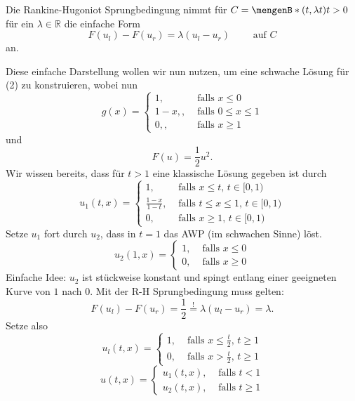 \begin{bemerkung}
	Die Rankine-Hugoniot Sprungbedingung nimmt für $C = \set[(t,\lambda t)]{t >0}$ für ein $\lambda \in \mathbb{R}$ die einfache Form
	\[
		F(u_l)-F(u_r) = \lambda (u_l-u_r) \qquad \text{ auf }C
	\]
	an.
\end{bemerkung} 
Diese einfache Darstellung wollen wir nun nutzen, um eine schwache Lösung für (2) zu konstruieren, wobei nun
\[
	g(x) = \begin{cases}
		1, &\text{ falls }x \leq 0\\
		1-x, , &\text{ falls }0 \leq x \leq 1 \\
		0, , &\text{ falls }x \geq 1
	\end{cases}
\]
und \[
	F(u) = \frac{1}{2} u^2.
\]
Wir wissen bereits, dass für $t>1$ eine klassische Lösung gegeben ist durch
\[
	u_1(t,x) = \begin{cases}
		1, &\text{ falls }x \leq t, \,t \in [0,1)\\
		\frac{1-x}{1-t} , &\text{ falls }t \leq x \leq 1, \, t \in [0,1) \\
		0, &\text{ falls }x \geq  1, \,t \in [0,1)
		\end{cases}
\]
Setze $u_1$ fort durch $u_2$, dass in $t=1$ das AWP (im schwachen Sinne) löst.
\[
	u_2(1,x) = \begin{cases}
		1, &\text{ falls }x \leq 0\\
		0, &\text{ falls }x \geq 0
	\end{cases} 
\]
Einfache Idee: $u_2$ ist stückweise konstant und spingt entlang einer geeigneten Kurve von $1$ nach $0$. Mit der R-H Sprungbedingung muss gelten:
\[
	F(u_l)- F(u_r) = \frac{1}{2} \stackrel{!}{=} \lambda ( u_l - u_r) = \lambda.
\]
Setze also
\[
	u_l(t,x) = \begin{cases}
		1, &\text{ falls }x \leq \frac{t}{2}, \,t \geq 1\\
		0, &\text{ falls }x > \frac{t}{2}, \,t \geq 1
	\end{cases}
\]
\[
	u(t,x) = \begin{cases}
		u_1(t,x), &\text{ falls }t<1\\
		u_2(t,x), &\text{ falls }t \geq 1
	\end{cases}
\]